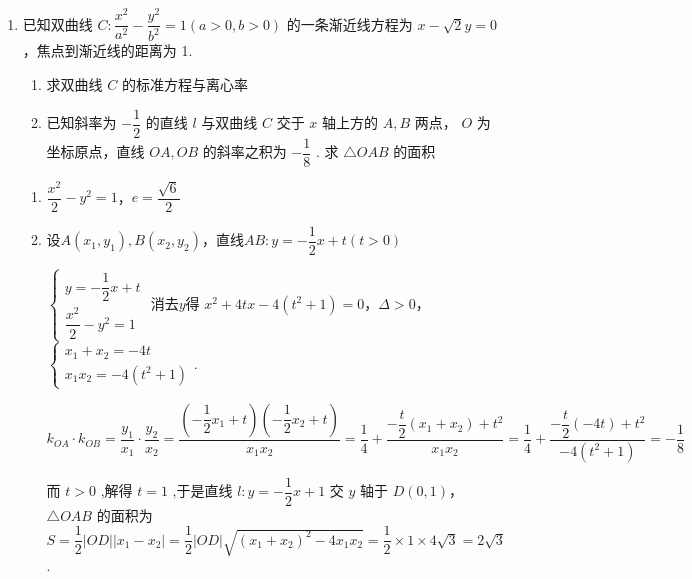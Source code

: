 \begin{enumerate}
\begin{enumerate}
\begin{jieda}
\begin{enumerate}
                故满足条件的直线 $l$ 有两条，其方程分别为 $y = \sqrt{2}x + 2$ 和 $y =  - \sqrt{2}x + 2$ .
            \end{enumerate}
        \end{jieda}

        \item 已知双曲线 $C : \dfrac{{x}^{2}}{{a}^{2}} - \dfrac{{y}^{2}}{{b}^{2}} = 1\left( {a > 0,b > 0}\right)$ 的一条渐近线方程为 $x - \sqrt{2}y = 0$ ，焦点到渐近线的距离为 1.
        \begin{enumerate}
            \item 求双曲线 $C$ 的标准方程与离心率
            \item 已知斜率为 $- \dfrac{1}{2}$ 的直线 $l$ 与双曲线 $C$ 交于 $x$ 轴上方的 $A,B$ 两点， $O$ 为坐标原点，直线 ${OA},{OB}$ 的斜率之积为 $- \dfrac{1}{8}$ . 求 $\bigtriangleup {OAB}$ 的面积
        \end{enumerate}
        \begin{jieda}
            \begin{enumerate}
                \item $\dfrac{x^2}{2} - y^2 = 1$，$e = \dfrac{\sqrt{6}}{2}$
                \item 设$A(x_1, y_1), B(x_2, y_2)$，直线$AB: y = -\dfrac{1}{2}x+t (t>0)$
                
                $\left\{  \begin{array}{l} y =  - \dfrac{1}{2}x + t \\  \dfrac{{x}^{2}}{2} - {y}^{2} = 1 \end{array}\right.$ 消去$y$得 ${x}^{2} + {4tx} - 4\left( {{t}^{2} + 1}\right)  = 0$，$\Delta > 0$，$\left\{\begin{array}{l}
                    {x}_{1} + {x}_{2} =  - {4t} \\
                    x_1x_2 =  - 4\left( {{t}^{2} + 1} \right)
                \end{array}\right.$.
                
                ${k}_{OA} \cdot  {k}_{OB} = \dfrac{{y}_{1}}{{x}_{1}} \cdot  \dfrac{{y}_{2}}{{x}_{2}} = \dfrac{\left( {-\dfrac{1}{2}{x}_{1} + t}\right) \left( {-\dfrac{1}{2}{x}_{2} + t}\right) }{{x}_{1}{x}_{2}} = \dfrac{1}{4} + \dfrac{-\dfrac{t}{2}\left( {{x}_{1} + {x}_{2}}\right)  + {t}^{2}}{{x}_{1}{x}_{2}} = \dfrac{1}{4} + \dfrac{-\dfrac{t}{2}\left( {-{4t}}\right)  + {t}^{2}}{-4\left( {{t}^{2} + 1}\right) } =  - \dfrac{1}{8}$
                
                而 $t > 0$ ,解得 $t = 1$ ,于是直线 $l : y =  - \dfrac{1}{2}x + 1$ 交 $y$ 轴于 $D\left( {0,1}\right)$，$\bigtriangleup {OAB}$ 的面积为 $S = \dfrac{1}{2}\left| {OD}\right| \left| {x}_{1} - {x}_{2}\right| = \dfrac{1}{2}\left| {OD}\right| \sqrt{{\left( {x}_{1} + {x}_{2}\right) }^{2} - 4{x}_{1}{x}_{2}} = \dfrac{1}{2} \times  1 \times  4\sqrt{3} = 2\sqrt{3}$.
            \end{enumerate}
        \end{jieda}


\end{enumerate}
\end{enumerate}
